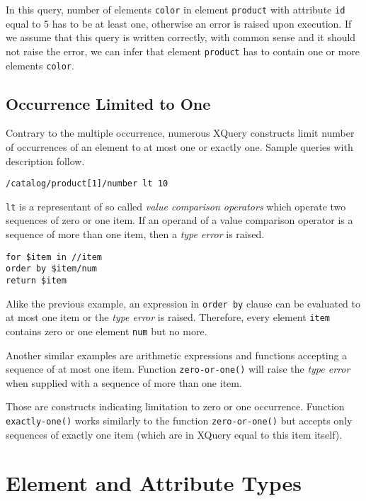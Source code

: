 In this query, number of elements \texttt{color} in element \texttt{product} with attribute \texttt{id} equal to 5 has to be at least one, otherwise an error is raised upon execution. If we assume that this query is written correctly, with common sense and it should not raise the error, we can infer that element \texttt{product} has to contain one or more elements \texttt{color}.

\subsection{Occurrence Limited to One}
Contrary to the multiple occurrence, numerous XQuery constructs limit number of occurrences of an element to at most one or exactly one. Sample queries with description follow.

\begin{verbatim}
/catalog/product[1]/number lt 10
\end{verbatim}

\texttt{lt} is a representant of so called \emph{value comparison operators}  which operate two sequences of zero or one item. If an operand of a value comparison operator is a sequence of more than one item, then a \emph{type error}  is raised.

\begin{verbatim}
for $item in //item 
order by $item/num 
return $item
\end{verbatim}

Alike the previous example, an expression in \texttt{order by} clause can be evaluated to at most one item or the \emph{type error} is raised. Therefore, every element \texttt{item} contains zero or one element \texttt{num} but no more.

Another similar examples are arithmetic expressions and functions accepting a sequence of at most one item. Function \texttt{zero-or-one()} will raise the \emph{type error} when supplied with a sequence of more than one item.

Those are constructs indicating limitation to zero or one occurrence. Function \texttt{exactly-one()} works similarly to the function \texttt{zero-or-one()} but accepts only sequences of exactly one item (which are in XQuery equal to this item itself).

\section{Element and Attribute Types}

